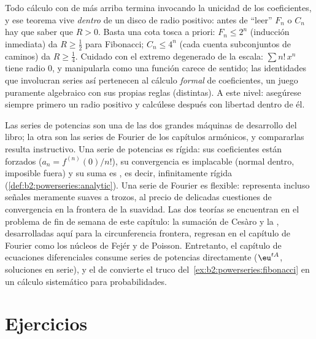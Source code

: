 \begin{remark}
Todo cálculo con  de más arriba termina
invocando la unicidad de los coeficientes, y ese teorema vive
\emph{dentro} de un disco de radio positivo: antes de ``leer'' $F_n$
o $C_n$ hay que saber que $R > 0$. Basta una cota tosca a priori:
$F_n \leq 2^n$ (inducción inmediata) da $R \geq \frac12$ para
Fibonacci; $C_n \leq 4^n$ (cada  cuenta
subconjuntos de caminos) da $R \geq \frac14$. Cuidado con el extremo
degenerado de la escala: $\sum n!\,x^n$ tiene radio $0$, y
manipularla como una función carece de sentido; las identidades que
involucran series así pertenecen al cálculo \emph{formal} de
coeficientes, un juego puramente algebraico con sus propias reglas
(distintas). A este nivel: asegúrese siempre primero un radio
positivo y calcúlese después con libertad dentro de él.
\end{remark}

\begin{remark}
Las series de potencias son una de las dos grandes máquinas de
desarrollo del libro; la otra son las series de Fourier de los
capítulos armónicos, y compararlas resulta instructivo. Una serie de
potencias es rígida: sus coeficientes están forzados ($a_n =
f^{(n)}(0)/n!$), su convergencia es implacable (normal dentro,
imposible fuera) y su suma es , es decir, infinitamente
rígida (\cref{def:b2:powerseries:analytic}). Una serie de Fourier es
flexible: representa incluso señales meramente suaves a trozos, al
precio de delicadas cuestiones de convergencia en la frontera de la
suavidad. Las dos teorías se encuentran en el problema de fin de
semana de este capítulo: la sumación de Cesàro y la , desarrolladas aquí para la circunferencia frontera, regresan
en el capítulo de Fourier como los núcleos de Fejér y de Poisson.
Entretanto, el capítulo de ecuaciones diferenciales consume series
de potencias directamente ($\eu^{tA}$, soluciones en serie), y el de
 convierte el truco del~\cref{ex:b2:powerseries:fibonacci} en un cálculo sistemático para
probabilidades.
\end{remark}

\section{Ejercicios}

